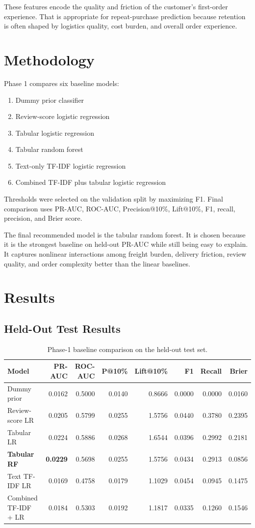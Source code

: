\documentclass[11pt,a4paper]{article}
\begin{document}
These features encode the quality and friction of the customer's first-order experience. That is appropriate for repeat-purchase prediction because retention is often shaped by logistics quality, cost burden, and overall order experience.

\section{Methodology}
Phase 1 compares six baseline models:
\begin{enumerate}
\item Dummy prior classifier
\item Review-score logistic regression
\item Tabular logistic regression
\item Tabular random forest
\item Text-only TF-IDF logistic regression
\item Combined TF-IDF plus tabular logistic regression
\end{enumerate}

Thresholds were selected on the validation split by maximizing F1. Final comparison uses PR-AUC, ROC-AUC, Precision@10\%, Lift@10\%, F1, recall, precision, and Brier score.

The final recommended model is the tabular random forest. It is chosen because it is the strongest baseline on held-out PR-AUC while still being easy to explain. It captures nonlinear interactions among freight burden, delivery friction, review quality, and order complexity better than the linear baselines.

\section{Results}
\subsection{Held-Out Test Results}
\begin{table}[H]
\centering
\small
\begin{tabular}{lrrrrrrr}
\toprule
Model & PR-AUC & ROC-AUC & P@10\% & Lift@10\% & F1 & Recall & Brier \\
\midrule
Dummy prior & 0.0162 & 0.5000 & 0.0140 & 0.8666 & 0.0000 & 0.0000 & 0.0160 \\
Review-score LR & 0.0205 & 0.5799 & 0.0255 & 1.5756 & 0.0440 & 0.3780 & 0.2395 \\
Tabular LR & 0.0224 & 0.5886 & 0.0268 & 1.6544 & 0.0396 & 0.2992 & 0.2181 \\
\textbf{Tabular RF} & \textbf{0.0229} & 0.5698 & 0.0255 & 1.5756 & 0.0434 & 0.2913 & 0.0856 \\
Text TF-IDF LR & 0.0169 & 0.4758 & 0.0179 & 1.1029 & 0.0454 & 0.0945 & 0.1475 \\
Combined TF-IDF + LR & 0.0184 & 0.5303 & 0.0192 & 1.1817 & 0.0335 & 0.1260 & 0.1546 \\
\bottomrule
\end{tabular}
\caption{Phase-1 baseline comparison on the held-out test set.}
\end{table}
\end{document}

